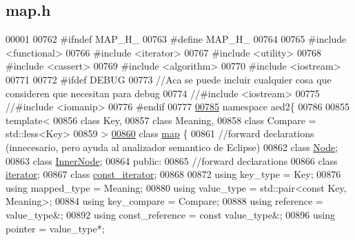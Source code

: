 \hypertarget{map_8h_source}{\subsection{map.\-h}
}

\begin{DoxyCode}
00001 
00762 \textcolor{preprocessor}{#ifndef MAP\_H\_}
00763 \textcolor{preprocessor}{}\textcolor{preprocessor}{#define MAP\_H\_}
00764 \textcolor{preprocessor}{}
00765 \textcolor{preprocessor}{#include <functional>}
00766 \textcolor{preprocessor}{#include <iterator>}
00767 \textcolor{preprocessor}{#include <utility>}
00768 \textcolor{preprocessor}{#include <cassert>}
00769 \textcolor{preprocessor}{#include <algorithm>}
00770 \textcolor{preprocessor}{#include <iostream>}
00771 
00772 \textcolor{preprocessor}{#ifdef DEBUG}
00773 \textcolor{preprocessor}{}\textcolor{comment}{//Aca se puede incluir cualquier cosa que consideren que necesitan para debug}
00774 \textcolor{comment}{//#include <iostream>}
00775 \textcolor{comment}{//#include <iomanip>}
00776 \textcolor{preprocessor}{#endif}
00777 \textcolor{preprocessor}{}
\hypertarget{map_8h_source_l00785}{}\hyperlink{namespaceaed2}{00785} \textcolor{keyword}{namespace }aed2\{
00786 
00855 \textcolor{keyword}{template}<
00856   \textcolor{keyword}{class }Key,
00857   \textcolor{keyword}{class }Meaning,
00858   \textcolor{keyword}{class }Compare = std::less<Key>
00859 >
\hypertarget{map_8h_source_l00860}{}\hyperlink{classaed2_1_1map}{00860} \textcolor{keyword}{class }\hyperlink{classaed2_1_1map}{map} \{
00861     \textcolor{comment}{//forward declarations (innecesario, pero ayuda al analizador semantico de
       Eclipse)}
00862     \textcolor{keyword}{class }\hyperlink{structaed2_1_1map_1_1Node}{Node};
00863     \textcolor{keyword}{class }\hyperlink{structaed2_1_1map_1_1InnerNode}{InnerNode};
00864 \textcolor{keyword}{public}:
00865     \textcolor{comment}{//forward declarations}
00866     \textcolor{keyword}{class }\hyperlink{classaed2_1_1map_1_1iterator}{iterator};
00867     \textcolor{keyword}{class }\hyperlink{classaed2_1_1map_1_1const__iterator}{const_iterator};
00868 
00872     \textcolor{keyword}{using} key\_type = Key;
00876     \textcolor{keyword}{using} mapped\_type = Meaning;
00880     \textcolor{keyword}{using} value\_type = std::pair<const Key, Meaning>;
00884     \textcolor{keyword}{using} key\_compare = Compare;
00888     \textcolor{keyword}{using} reference = value\_type&;
00892     \textcolor{keyword}{using} const\_reference = \textcolor{keyword}{const} value\_type&;
00896     \textcolor{keyword}{using} pointer = value\_type*;

\end{DoxyCode}
